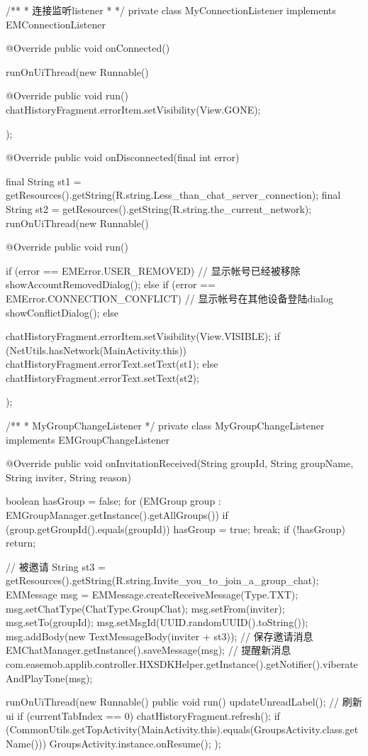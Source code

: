 {{	}

	/**
	 * 连接监听listener
	 * 
	 */
	private class MyConnectionListener implements EMConnectionListener {

		@Override
		public void onConnected() {
			runOnUiThread(new Runnable() {

				@Override
				public void run() {
					chatHistoryFragment.errorItem.setVisibility(View.GONE);
				}

			});
		}

		@Override
		public void onDisconnected(final int error) {
			final String st1 = getResources().getString(R.string.Less_than_chat_server_connection);
			final String st2 = getResources().getString(R.string.the_current_network);
			runOnUiThread(new Runnable() {

				@Override
				public void run() {
					if (error == EMError.USER_REMOVED) {
						// 显示帐号已经被移除
						showAccountRemovedDialog();
					} else if (error == EMError.CONNECTION_CONFLICT) {
						// 显示帐号在其他设备登陆dialog
						showConflictDialog();
					} else {
						chatHistoryFragment.errorItem.setVisibility(View.VISIBLE);
						if (NetUtils.hasNetwork(MainActivity.this))
							chatHistoryFragment.errorText.setText(st1);
						else
							chatHistoryFragment.errorText.setText(st2);

					}
				}

			});
		}
	}

	/**
	 * MyGroupChangeListener
	 */
	private class MyGroupChangeListener implements EMGroupChangeListener {

		@Override
		public void onInvitationReceived(String groupId, String groupName, String inviter, String reason) {
			boolean hasGroup = false;
			for (EMGroup group : EMGroupManager.getInstance().getAllGroups()) {
				if (group.getGroupId().equals(groupId)) {
					hasGroup = true;
					break;
				}
			}
			if (!hasGroup)
				return;

			// 被邀请
			String st3 = getResources().getString(R.string.Invite_you_to_join_a_group_chat);
			EMMessage msg = EMMessage.createReceiveMessage(Type.TXT);
			msg.setChatType(ChatType.GroupChat);
			msg.setFrom(inviter);
			msg.setTo(groupId);
			msg.setMsgId(UUID.randomUUID().toString());
			msg.addBody(new TextMessageBody(inviter + st3));
			// 保存邀请消息
			EMChatManager.getInstance().saveMessage(msg);
			// 提醒新消息
			com.easemob.applib.controller.HXSDKHelper.getInstance().getNotifier().viberateAndPlayTone(msg);

			runOnUiThread(new Runnable() {
				public void run() {
					updateUnreadLabel();
					// 刷新ui
					if (currentTabIndex == 0)
						chatHistoryFragment.refresh();
					if (CommonUtils.getTopActivity(MainActivity.this).equals(GroupsActivity.class.getName())) {
						GroupsActivity.instance.onResume();
					}
				}
			});

}}}
